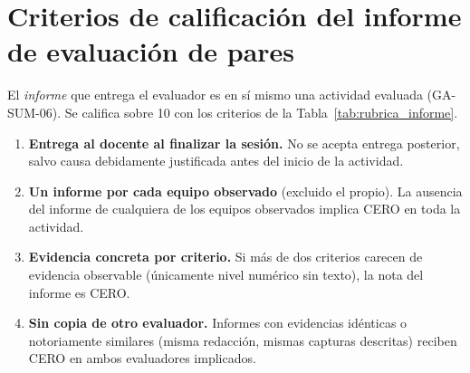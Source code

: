 \documentclass[11pt]{article}
\begin{document}
\section{\textcolor{utegreendk}{Criterios de calificación del informe de evaluación de pares}}

El \emph{informe} que entrega el evaluador es en sí mismo una actividad evaluada (GA-SUM-06). Se califica sobre 10 con los criterios de la Tabla~\ref{tab:rubrica_informe}.

\begin{cajapiso}[title={Criterios de piso del informe: incumplimiento implica CERO en el informe}]
	\begin{enumerate}[label=\textbf{P\arabic*.},leftmargin=24pt,itemsep=3pt]
		\item \textbf{Entrega al docente al finalizar la sesión.} No se acepta entrega posterior, salvo causa debidamente justificada antes del inicio de la actividad.
		\item \textbf{Un informe por cada equipo observado} (excluido el propio). La ausencia del informe de cualquiera de los equipos observados implica CERO en toda la actividad.
		\item \textbf{Evidencia concreta por criterio.} Si más de dos criterios carecen de evidencia observable (únicamente nivel numérico sin texto), la nota del informe es CERO.
		\item \textbf{Sin copia de otro evaluador.} Informes con evidencias idénticas o notoriamente similares (misma redacción, mismas capturas descritas) reciben CERO en ambos evaluadores implicados.
	\end{enumerate}
\end{cajapiso}
\end{document}
